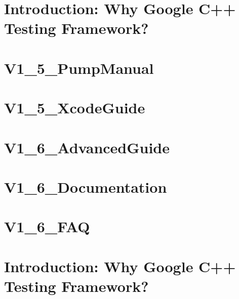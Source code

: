 \documentclass[twoside]{book}
\newcommand{\+}{\discretionary{\mbox{\scriptsize$\hookleftarrow$}}{}{}}
\begin{document}
\chapter{Introduction\+: Why Google C++ Testing Framework?}
\label{md_vendor_googletest_googletest_docs_V1_5_Primer}
\hypertarget{md_vendor_googletest_googletest_docs_V1_5_Primer}{}

\chapter{V1\+\_\+5\+\_\+\+Pump\+Manual}
\label{md_vendor_googletest_googletest_docs_V1_5_PumpManual}
\hypertarget{md_vendor_googletest_googletest_docs_V1_5_PumpManual}{}

\chapter{V1\+\_\+5\+\_\+\+Xcode\+Guide}
\label{md_vendor_googletest_googletest_docs_V1_5_XcodeGuide}
\hypertarget{md_vendor_googletest_googletest_docs_V1_5_XcodeGuide}{}

\chapter{V1\+\_\+6\+\_\+\+Advanced\+Guide}
\label{md_vendor_googletest_googletest_docs_V1_6_AdvancedGuide}
\hypertarget{md_vendor_googletest_googletest_docs_V1_6_AdvancedGuide}{}

\chapter{V1\+\_\+6\+\_\+\+Documentation}
\label{md_vendor_googletest_googletest_docs_V1_6_Documentation}
\hypertarget{md_vendor_googletest_googletest_docs_V1_6_Documentation}{}

\chapter{V1\+\_\+6\+\_\+\+F\+AQ}
\label{md_vendor_googletest_googletest_docs_V1_6_FAQ}
\hypertarget{md_vendor_googletest_googletest_docs_V1_6_FAQ}{}

\chapter{Introduction\+: Why Google C++ Testing Framework?}
\label{md_vendor_googletest_googletest_docs_V1_6_Primer}
\hypertarget{md_vendor_googletest_googletest_docs_V1_6_Primer}{}

\end{document}
